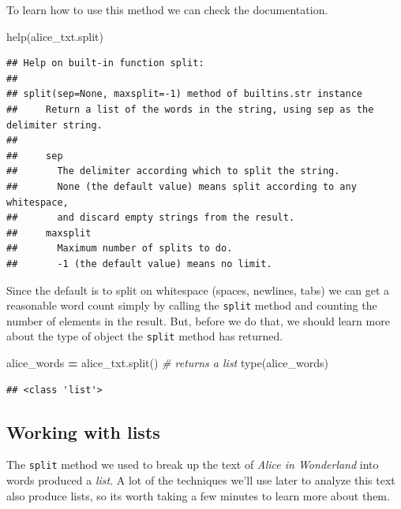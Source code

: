 \documentclass[]{book}
\newenvironment{Shaded}{\begin{snugshade}}{\end{snugshade}}
\newcommand{\BuiltInTok}[1]{#1}
\newcommand{\CommentTok}[1]{\textcolor[rgb]{0.56,0.35,0.01}{\textit{#1}}}
\newcommand{\NormalTok}[1]{#1}
\newcommand{\OperatorTok}[1]{\textcolor[rgb]{0.81,0.36,0.00}{\textbf{#1}}}
\begin{document}
To learn how to use this method we can check the documentation.

\begin{Shaded}
\begin{Highlighting}[]
\BuiltInTok{help}\NormalTok{(alice_txt.split)}
\end{Highlighting}
\end{Shaded}

\begin{verbatim}
## Help on built-in function split:
## 
## split(sep=None, maxsplit=-1) method of builtins.str instance
##     Return a list of the words in the string, using sep as the delimiter string.
##     
##     sep
##       The delimiter according which to split the string.
##       None (the default value) means split according to any whitespace,
##       and discard empty strings from the result.
##     maxsplit
##       Maximum number of splits to do.
##       -1 (the default value) means no limit.
\end{verbatim}

Since the default is to split on whitespace (spaces, newlines, tabs) we can get a reasonable word count simply by calling the \texttt{split} method and counting the number of elements in the result. But, before we do that, we should learn more about the type of object the \texttt{split} method has returned.

\begin{Shaded}
\begin{Highlighting}[]
\NormalTok{alice_words }\OperatorTok{=}\NormalTok{ alice_txt.split() }\CommentTok{# returns a list}
\BuiltInTok{type}\NormalTok{(alice_words)}
\end{Highlighting}
\end{Shaded}

\begin{verbatim}
## <class 'list'>
\end{verbatim}

\hypertarget{working-with-lists}{%
\subsection{Working with lists}\label{working-with-lists}}

The \texttt{split} method we used to break up the text of \emph{Alice in Wonderland} into words produced a \emph{list}. A lot of the techniques we'll use later to analyze this text also produce lists, so its worth taking a few minutes to learn more about them.
\end{document}
